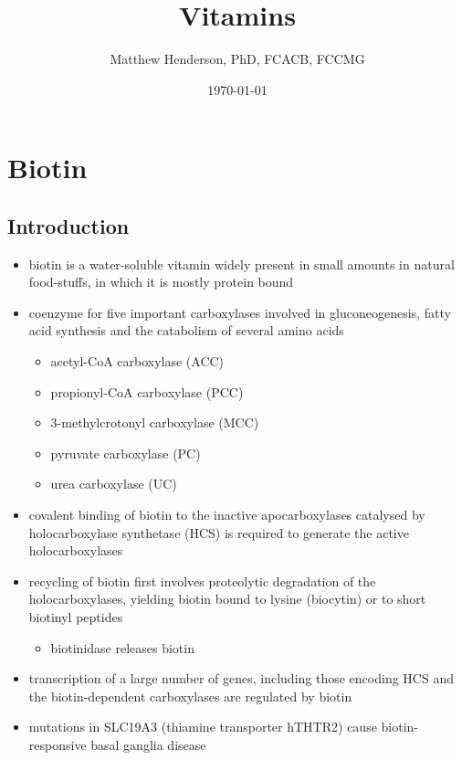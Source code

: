 \documentclass[12pt]{scrartcl}
\author{Matthew Henderson, PhD, FCACB, FCCMG}
\date{\today}
\title{Vitamins}
\begin{document}
\maketitle
\setcounter{tocdepth}{2}
\tableofcontents



\section{Biotin}
\label{sec:orgd408046}
\subsection{Introduction}
\label{sec:org50717a1}
\begin{itemize}
\item biotin is a water-soluble vitamin widely present in small amounts in
natural food-stuffs, in which it is mostly protein bound
\item coenzyme for five important carboxylases involved in
gluconeogenesis, fatty acid synthesis and the catabolism of several
amino acids
\begin{itemize}
\item acetyl-CoA carboxylase (ACC)
\end{itemize}
\begin{itemize}
\item propionyl-CoA carboxylase (PCC)
\end{itemize}
\begin{itemize}
\item 3-methylcrotonyl carboxylase (MCC)
\end{itemize}
\begin{itemize}
\item pyruvate carboxylase (PC)
\end{itemize}
\begin{itemize}
\item urea carboxylase (UC)
\end{itemize}

\item covalent binding of biotin to the inactive apocarboxylases
catalysed by holocarboxylase synthetase (HCS) is required to
generate the active holocarboxylases
\item recycling of biotin first involves proteolytic degradation of the
holocarboxylases, yielding biotin bound to lysine (biocytin) or to
short biotinyl peptides
\begin{itemize}
\item biotinidase releases biotin
\end{itemize}
\item transcription of a large number of genes, including those encoding
HCS and the biotin-dependent carboxylases are regulated by biotin
\item mutations in SLC19A3 (thiamine transporter hTHTR2) cause
biotin-responsive basal ganglia disease
\end{itemize}
\end{document}
